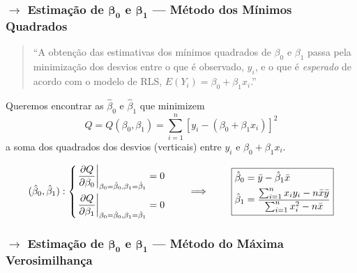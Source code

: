 \subsubsection[7.1.1 Estimação de $\beta_0$ e $\beta_1$ --- Método dos Mínimos Quadrados]{$\pmb{\rightarrow}$ Estimação de $\pmb{\beta_0}$ e $\pmb{\beta_1}$ --- Método dos Mínimos Quadrados}

\begin{quote} \small
    ``A obtenção das estimativas dos mínimos quadrados de $\beta_0$ e $\beta_1$ passa pela minimização dos desvios entre o que é observado, $y_i$, e o que é \textit{esperado} de acordo com o modelo de RLS, $E(Y_i) = \beta_0 + \beta_1 x_i$.''\cite{Morais2020}
\end{quote}

\begin{mdframed}
    \noindent Queremos encontrar as $\hat{\beta}_0$ e $\hat{\beta}_1$ que minimizem
    $$
        Q = Q(\beta_0, \beta_1) = \sum^{n}_{i=1} \left[y_i - (\beta_0 + \beta_1 x_i)\right]^2
    $$
    a soma dos quadrados dos desvios (verticais) entre $y_i$ e $\beta_0 + \beta_1 x_i$.
\end{mdframed}

{\setlength{\fboxsep}{1.75\fboxsep}%
$$
    (\hat{\beta}_0, \hat{\beta}_1) : \left\{
    \begin{aligned}
        \left.\frac{\partial Q}{\partial \beta_0}\right|_{\beta_0 = \hat{\beta}_0,\beta_1 = \hat{\beta}_1} &= 0 \\
        \left.\frac{\partial Q}{\partial \beta_1}\right|_{\beta_0 = \hat{\beta}_0,\beta_1 = \hat{\beta}_1} &= 0 \\
    \end{aligned}\right.
    \qquad \implies \qquad \boxed{%
    \begin{aligned}
        \hat{\beta}_0 &= \bar{y} - \hat{\beta}_1 \bar{x} \\
        \hat{\beta}_1 &= \frac{\sum^{n}_{i=1} x_i y_i - n \bar{x} \bar{y}}{\sum^{n}_{i=1} x^2_i - n \bar{x}} 
    \end{aligned}}
$$
}

\subsubsection[7.1.2 Estimação de $\beta_0$ e $\beta_1$ --- Método do Máxima Verosimilhança]{$\pmb{\rightarrow}$ Estimação de $\pmb{\beta_0}$ e $\pmb{\beta_1}$ --- Método do Máxima Verosimilhança}

